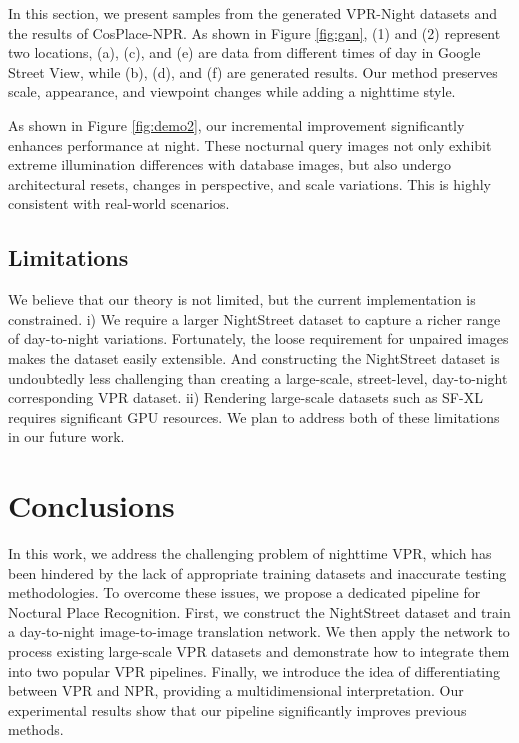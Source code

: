 \documentclass[10pt,twocolumn,letterpaper]{article}
\begin{document}
In this section, we present samples from the generated VPR-Night datasets and the results of CosPlace-NPR. As shown in Figure \ref{fig:gan}, (1) and (2) represent two locations, (a), (c), and (e) are data from different times of day in Google Street View, while (b), (d), and (f) are generated results. Our method preserves scale, appearance, and viewpoint changes while adding a nighttime style.

As shown in Figure \ref{fig:demo2}, our incremental improvement significantly enhances performance at night. These nocturnal query images not only exhibit extreme illumination differences with database images, but also undergo architectural resets, changes in perspective, and scale variations. This is highly consistent with real-world scenarios.

\subsection{Limitations}

We believe that our theory is not limited, but the current implementation is constrained. i) We require a larger NightStreet dataset to capture a richer range of day-to-night variations. Fortunately, the loose requirement for unpaired images makes the dataset easily extensible. And constructing the NightStreet dataset is undoubtedly less challenging than creating a large-scale, street-level, day-to-night corresponding VPR dataset. ii) Rendering large-scale datasets such as SF-XL requires significant GPU resources. We plan to address both of these limitations in our future work.


\section{Conclusions}

In this work, we address the challenging problem of nighttime VPR, which has been hindered by the lack of appropriate training datasets and inaccurate testing methodologies. To overcome these issues, we propose a dedicated pipeline for Noctural Place Recognition. First, we construct the NightStreet dataset and train a day-to-night image-to-image translation network. We then apply the network to process existing large-scale VPR datasets and demonstrate how to integrate them into two popular VPR pipelines. Finally, we introduce the idea of differentiating between VPR and NPR, providing a multidimensional interpretation. Our experimental results show that our pipeline significantly improves previous methods.

{\small


}
\end{document}
